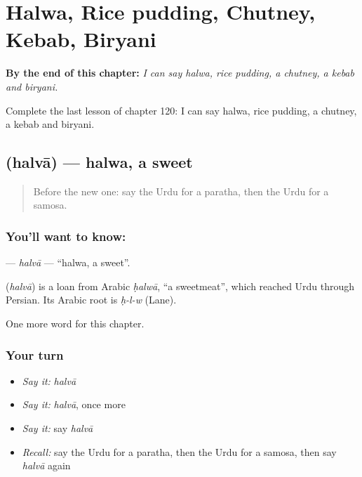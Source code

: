 
\chapter{Halwa, Rice pudding, Chutney, Kebab, Biryani}
\label{ch:ur-halwa-rice-pudding-chutney-kebab-biryani}

\begin{chapteropening}
\textbf{By the end of this chapter:} \emph{I can say halwa, rice pudding, a chutney, a kebab and biryani.}

Complete the last lesson of chapter 120: I can say halwa, rice pudding, a chutney, a kebab and biryani.
\end{chapteropening}

\section[\texorpdfstring{\ur{حلوہ} (halvā)}{حلوہ (halvā)}]{ (halvā) — halwa, a sweet}

\label{lesson:UR-C120-halva}



\begin{quote}
Before the new one: say the Urdu for a paratha, then the Urdu for a samosa.
\end{quote}

\subsection*{You'll want to know: }
\textbf{} — \emph{halvā} — \textquotedblleft{}halwa, a sweet\textquotedblright{}.

\begin{cousinweb}
\textbf{} (\emph{halvā}) is a loan from Arabic \emph{ḥalwā}, \textquotedblleft{}a sweetmeat\textquotedblright{}, which reached Urdu through Persian. Its Arabic root is \emph{ḥ-l-w} (Lane).
\end{cousinweb}

\begin{grammarlens}[title={What you've built}]
One more word for this chapter.
\end{grammarlens}

\subsection*{Your turn}
\begin{itemize}
\raggedright
  \item \emph{Say it:} \emph{halvā}
  \item \emph{Say it:} \emph{halvā}, once more
  \item \emph{Say it:} say \emph{halvā}
  \item \emph{Recall:} say the Urdu for a paratha, then the Urdu for a samosa, then say \emph{halvā} again
\end{itemize}

